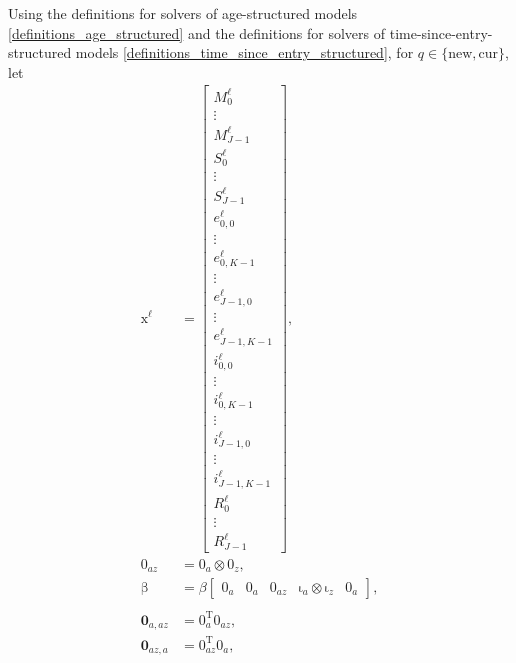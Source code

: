 \documentclass[USenglish]{article}
\renewcommand{\vec}[1]{\boldsymbol{\mathrm{#1}}}
\newcommand{\mat}[1]{\mathbf{#1}}
\begin{document}
Using the definitions for solvers of age-structured models
\eqref{definitions_age_structured} and the definitions for solvers of
time-since-entry-structured models
\eqref{definitions_time_since_entry_structured},
for $q \in \{\mathrm{new}, \mathrm{cur}\}$, let
\begin{subequations}
  \begin{align}
    \vec{x}^{\ell} &=
    \begin{bmatrix}
      M_0^{\ell} \\ \vdots \\ M_{J - 1}^{\ell} \\
      S_0^{\ell} \\ \vdots \\ S_{J - 1}^{\ell} \\
      e_{0, 0}^{\ell} \\ \vdots \\ e_{0, K - 1}^{\ell} \\ \vdots
      \\ e_{J - 1, 0}^{\ell} \\ \vdots \\ e_{J - 1, K - 1}^{\ell} \\
      i_{0, 0}^{\ell} \\ \vdots \\ i_{0, K - 1}^{\ell} \\ \vdots
      \\ i_{J - 1, 0}^{\ell} \\ \vdots \\ i_{J - 1, K - 1}^{\ell} \\
      R_0^{\ell} \\ \vdots \\ R_{J - 1}^{\ell}
    \end{bmatrix},
    \\
    \vec{0}_{az} &=
    \vec{0}_{a} \otimes \vec{0}_z,
    \\
    \vec{\beta} &=
    \beta
    \begin{bmatrix}
      \vec{0}_a
      & \vec{0}_a
      & \vec{0}_{az}
      & \vec{\iota}_a \otimes \vec{\iota}_z
      & \vec{0}_a
    \end{bmatrix},
    \\
    \\
    \mat{0}_{a,az} &=
    \vec{0}_a^{\mathrm{T}} \vec{0}_{az},
    \\
    \mat{0}_{az,a} &=
    \vec{0}_{az}^{\mathrm{T}} \vec{0}_a,

\end{align}
\end{subequations}
\end{document}

